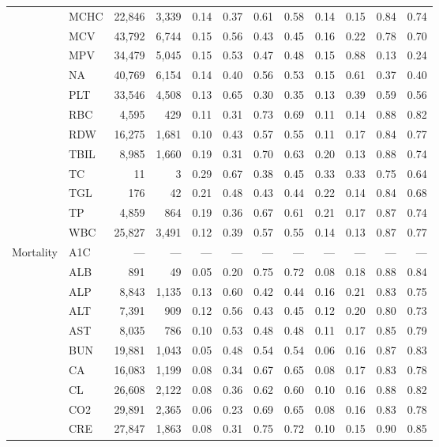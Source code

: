 \begin{table}[ht]
\begin{tabular}{llrrrrrrrrrr}
 & MCHC & 22,846 & 3,339 & 0.14 & 0.37 & 0.61 & 0.58 & 0.14 & 0.15 & 0.84 & 0.74 \\
 & MCV & 43,792 & 6,744 & 0.15 & 0.56 & 0.43 & 0.45 & 0.16 & 0.22 & 0.78 & 0.70 \\
 & MPV & 34,479 & 5,045 & 0.15 & 0.53 & 0.47 & 0.48 & 0.15 & 0.88 & 0.13 & 0.24 \\
 & NA & 40,769 & 6,154 & 0.14 & 0.40 & 0.56 & 0.53 & 0.15 & 0.61 & 0.37 & 0.40 \\
 & PLT & 33,546 & 4,508 & 0.13 & 0.65 & 0.30 & 0.35 & 0.13 & 0.39 & 0.59 & 0.56 \\
 & RBC & 4,595 & 429 & 0.11 & 0.31 & 0.73 & 0.69 & 0.11 & 0.14 & 0.88 & 0.82 \\
 & RDW & 16,275 & 1,681 & 0.10 & 0.43 & 0.57 & 0.55 & 0.11 & 0.17 & 0.84 & 0.77 \\
 & TBIL & 8,985 & 1,660 & 0.19 & 0.31 & 0.70 & 0.63 & 0.20 & 0.13 & 0.88 & 0.74 \\
 & TC & 11 & 3 & 0.29 & 0.67 & 0.38 & 0.45 & 0.33 & 0.33 & 0.75 & 0.64 \\
 & TGL & 176 & 42 & 0.21 & 0.48 & 0.43 & 0.44 & 0.22 & 0.14 & 0.84 & 0.68 \\
 & TP & 4,859 & 864 & 0.19 & 0.36 & 0.67 & 0.61 & 0.21 & 0.17 & 0.87 & 0.74 \\
 & WBC & 25,827 & 3,491 & 0.12 & 0.39 & 0.57 & 0.55 & 0.14 & 0.13 & 0.87 & 0.77 \\
\midrule
Mortality & A1C & --- & --- & --- & --- & --- & --- & --- & --- & --- & --- \\
 & ALB & 891 & 49 & 0.05 & 0.20 & 0.75 & 0.72 & 0.08 & 0.18 & 0.88 & 0.84 \\
 & ALP & 8,843 & 1,135 & 0.13 & 0.60 & 0.42 & 0.44 & 0.16 & 0.21 & 0.83 & 0.75 \\
 & ALT & 7,391 & 909 & 0.12 & 0.56 & 0.43 & 0.45 & 0.12 & 0.20 & 0.80 & 0.73 \\
 & AST & 8,035 & 786 & 0.10 & 0.53 & 0.48 & 0.48 & 0.11 & 0.17 & 0.85 & 0.79 \\
 & BUN & 19,881 & 1,043 & 0.05 & 0.48 & 0.54 & 0.54 & 0.06 & 0.16 & 0.87 & 0.83 \\
 & CA & 16,083 & 1,199 & 0.08 & 0.34 & 0.67 & 0.65 & 0.08 & 0.17 & 0.83 & 0.78 \\
 & CL & 26,608 & 2,122 & 0.08 & 0.36 & 0.62 & 0.60 & 0.10 & 0.16 & 0.88 & 0.82 \\
 & CO2 & 29,891 & 2,365 & 0.06 & 0.23 & 0.69 & 0.65 & 0.08 & 0.16 & 0.83 & 0.78 \\
 & CRE & 27,847 & 1,863 & 0.08 & 0.31 & 0.75 & 0.72 & 0.10 & 0.15 & 0.90 & 0.85 \\

\end{tabular}
\end{table}
